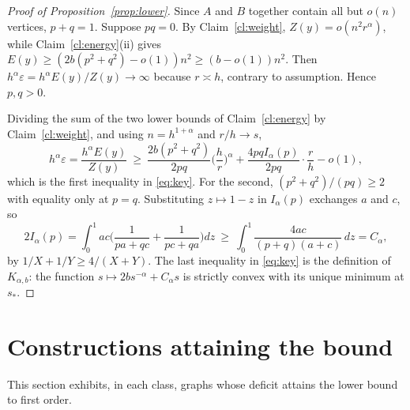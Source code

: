 \documentclass[11pt,a4paper]{article}
\theoremstyle{definition}
\newcommand{\eps}{\varepsilon}
\begin{document}
\begin{proof}[Proof of Proposition~\ref{prop:lower}]
Since $A$ and $B$ together contain all but $o(n)$ vertices, $p+q=1$. Suppose $pq=0$. By Claim~\ref{cl:weight}, $Z(y)=o(n^2r^\alpha)$, while Claim~\ref{cl:energy}(ii) gives $E(y)\ge(2b(p^2+q^2)-o(1))n^2\ge(b-o(1))n^2$. Then $h^\alpha\eps=h^\alpha E(y)/Z(y)\to\infty$ because $r\asymp h$, contrary to assumption. Hence $p,q>0$.

Dividing the sum of the two lower bounds of Claim~\ref{cl:energy} by Claim~\ref{cl:weight}, and using $n=h^{1+\alpha}$ and $r/h\to s$,
\[
 h^\alpha\eps=\frac{h^\alpha E(y)}{Z(y)}\ \ge\ \frac{2b(p^2+q^2)}{2pq}\Big(\frac hr\Big)^\alpha+\frac{4pqI_\alpha(p)}{2pq}\cdot\frac{r}{h}-o(1),
\]
which is the first inequality in \eqref{eq:key}. For the second, $(p^2+q^2)/(pq)\ge2$ with equality only at $p=q$. Substituting $z\mapsto1-z$ in $I_\alpha(p)$ exchanges $a$ and $c$, so
\[
 2I_\alpha(p)=\int_0^1ac\Big(\frac1{pa+qc}+\frac1{pc+qa}\Big)dz\ \ge\ \int_0^1\frac{4ac}{(p+q)(a+c)}\,dz=C_\alpha,
\]
by $1/X+1/Y\ge4/(X+Y)$. The last inequality in \eqref{eq:key} is the definition of $K_{\alpha,b}$: the function $s\mapsto 2bs^{-\alpha}+C_\alpha s$ is strictly convex with its unique minimum at $s_*$.
\end{proof}

\section{Constructions attaining the bound}\label{sec:construction}
This section exhibits, in each class, graphs whose deficit attains the lower bound to first order.
\end{document}
